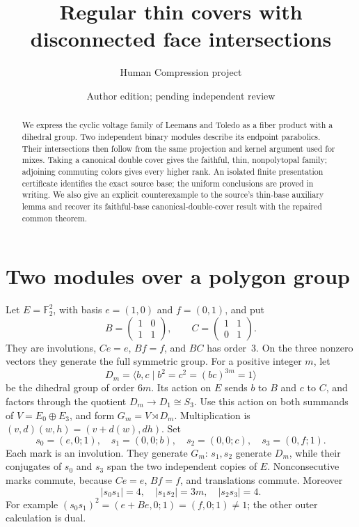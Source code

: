 \documentclass[a4paper,11pt]{article}
\title{Regular thin covers with disconnected face intersections}
\author{Human Compression project}\date{Author edition; pending independent review}
\newcommand{\gen}[1]{\langle#1\rangle}\newcommand{\Aut}{\operatorname{Aut}}
\begin{document}
\maketitle
\begin{abstract}
We express the cyclic voltage family of Leemans and Toledo as a fiber product
with a dihedral group. Two independent binary modules describe its endpoint
parabolics. Their intersections then follow from the same projection and kernel
argument used for mixes. Taking a canonical double cover gives the faithful,
thin, nonpolytopal family; adjoining commuting colors gives every higher rank.
An isolated finite presentation certificate identifies the exact source base;
the uniform conclusions are proved in writing. We also give an explicit
counterexample to the source's thin-base auxiliary lemma and recover its
faithful-base canonical-double-cover result with the repaired common theorem.
\end{abstract}

\section{Two modules over a polygon group}
Let $E=\mathbb F_2^2$, with basis $e=(1,0)$ and $f=(0,1)$, and put
\[
B=\begin{pmatrix}1&0\\1&1\end{pmatrix},\qquad
C=\begin{pmatrix}1&1\\0&1\end{pmatrix}.
\]
They are involutions, $Ce=e$, $Bf=f$, and $BC$ has order~3. On the three
nonzero vectors they generate the full symmetric group. For a positive
integer $m$, let
\[
D_m=\gen{b,c\mid b^2=c^2=(bc)^{3m}=1}
\]
be the dihedral group of order $6m$. Its action on $E$ sends $b$ to $B$
and $c$ to $C$, and factors through the quotient $D_m\to D_1\cong S_3$.
Use this action on both summands of $V=E_0\oplus E_3$, and form
$G_m=V\rtimes D_m$. Multiplication is
$(v,d)(w,h)=(v+d(w),dh)$. Set
\[
s_0=(e,0;1),\quad s_1=(0,0;b),\quad
s_2=(0,0;c),\quad s_3=(0,f;1).
\]
Each mark is an involution. They generate $G_m$: $s_1,s_2$ generate
$D_m$, while their conjugates of $s_0$ and $s_3$ span the two independent
copies of $E$. Nonconsecutive marks commute, because $Ce=e$, $Bf=f$,
and translations commute. Moreover
\[
|s_0s_1|=4,\quad |s_1s_2|=3m,\quad |s_2s_3|=4.       \tag{1}
\]
For example $(s_0s_1)^2=(e+Be,0;1)=(f,0;1)\ne1$;
the other outer calculation is dual.
\end{document}
